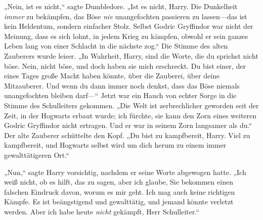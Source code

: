 „Nein, ist es nicht,“ sagte Dumbledore. „Ist es nicht, Harry. Die Dunkelheit \emph{immer} zu bekämpfen, das Böse \emph{nie} unangefochten passieren zu lassen—das ist kein Heldentum, sondern einfacher Stolz. Selbst Godric Gryffindor war nicht der Meinung, dass es sich lohnt, in jedem Krieg zu kämpfen, obwohl er sein ganzes Leben lang von einer Schlacht in die nächste zog.“ Die Stimme des alten Zauberers wurde leiser. „In Wahrheit, Harry, sind die Worte, die du sprichst nicht böse. Nein, nicht böse, und doch haben sie mich erschreckt. Du bist einer, der eines Tages große Macht haben könnte, über die Zauberei, über deine Mitzauberer. Und wenn du dann immer noch denkst, dass das Böse niemals unangefochten bleiben darf—“ Jetzt war ein Hauch von echter Sorge in die Stimme des Schulleiters gekommen. „Die Welt ist zerbrechlicher geworden seit der Zeit, in der Hogwarts erbaut wurde; ich fürchte, sie kann den Zorn eines weiteren Godric Gryffindor nicht ertragen. Und er war in seinem Zorn langsamer als du.“ Der alte Zauberer schüttelte den Kopf. „Du bist zu kampfbereit, Harry. Viel zu kampfbereit, und Hogwarts selbst wird um dich herum zu einem immer gewalttätigeren Ort.“

„Nun,“ sagte Harry vorsichtig, nachdem er seine Worte abgewogen hatte. „Ich weiß nicht, ob es hilft, das zu sagen, aber ich glaube, Sie bekommen einen falschen Eindruck davon, worum es mir geht. Ich mag auch keine richtigen Kämpfe. Es ist beängstigend und gewalttätig, und jemand könnte verletzt werden. Aber ich habe heute \emph{nicht} gekämpft, Herr Schulleiter.“

